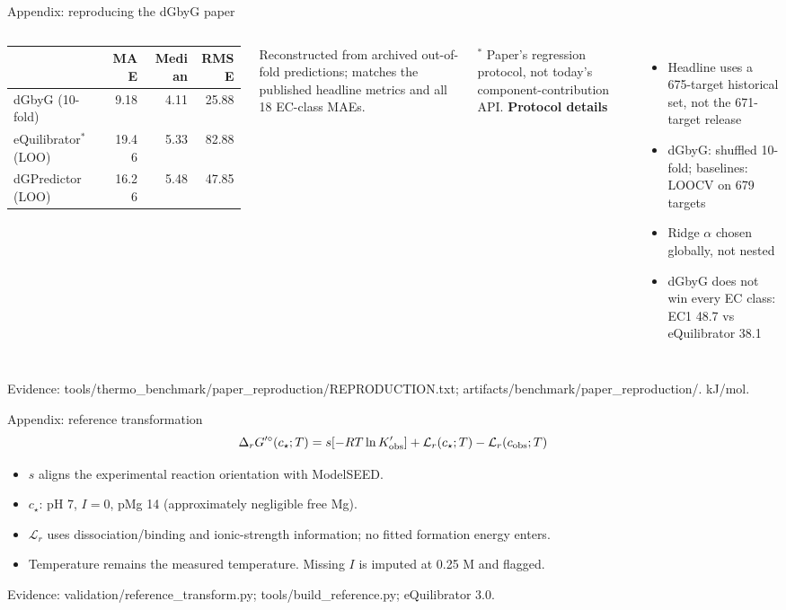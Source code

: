 \documentclass[aspectratio=169,11pt]{beamer}
\newcommand{\src}[1]{\vfill{\tiny\color{muted}Evidence: #1\par}}
\newcommand{\dg}{\Delta_r G^{\prime\circ}}
\newcommand{\gap}{\vspace{.18cm}}
\begin{document}
\appendix
\begin{frame}{Appendix: reproducing the dGbyG paper}
\begin{columns}[T]
\small
{\footnotesize\setlength{\tabcolsep}{4pt}\begin{tabular}{lrrr}
\toprule
& MAE & Median & RMSE\\\midrule
dGbyG (10-fold) & 9.18 & 4.11 & 25.88\\
eQuilibrator$^*$ (LOO) & 19.46 & 5.33 & 82.88\\
dGPredictor (LOO) & 16.26 & 5.48 & 47.85\\\bottomrule
\end{tabular}}\par\gap
Reconstructed from archived out-of-fold predictions; matches the published headline metrics and all 18 EC-class MAEs.\par\gap
{\scriptsize $^*$ Paper's regression protocol, not today's component-contribution API.}
\textbf{Protocol details}\gap
\begin{itemize}\small
\item Headline uses a 675-target historical set, not the 671-target release
\item dGbyG: shuffled 10-fold; baselines: LOOCV on 679 targets
\item Ridge $\alpha$ chosen globally, not nested
\item dGbyG does not win every EC class: EC1 48.7 vs eQuilibrator 38.1
\end{itemize}
\end{columns}
\src{tools/thermo\_benchmark/paper\_reproduction/REPRODUCTION.txt; artifacts/benchmark/paper\_reproduction/. kJ/mol.}
\end{frame}

\begin{frame}{Appendix: reference transformation}
\[
 \dg(c_\star;T)=s[-RT\ln K'_{\rm obs}]
 +\mathcal L_r(c_\star;T)-\mathcal L_r(c_{\rm obs};T)
\]
\begin{itemize}\item $s$ aligns the experimental reaction orientation with ModelSEED.\item $c_\star$: pH 7, $I=0$, pMg 14 (approximately negligible free Mg).\item $\mathcal L_r$ uses dissociation/binding and ionic-strength information; no fitted formation energy enters.\item Temperature remains the measured temperature. Missing $I$ is imputed at 0.25 M and flagged.\end{itemize}
\src{validation/reference\_transform.py; tools/build\_reference.py; eQuilibrator 3.0.}
\end{frame}
\end{document}
